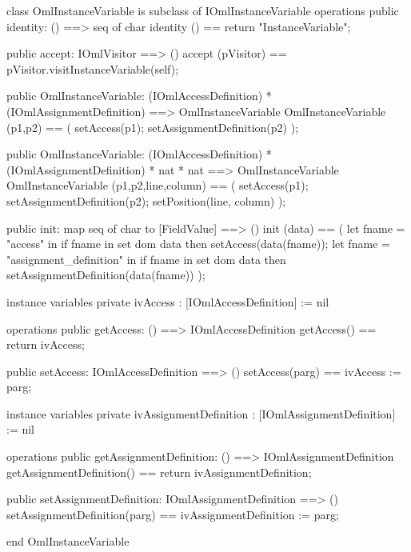 \begin{vdm_al}
class OmlInstanceVariable is subclass of IOmlInstanceVariable
operations
  public identity: () ==> seq of char
  identity () == return "InstanceVariable";

  public accept: IOmlVisitor ==> ()
  accept (pVisitor) == pVisitor.visitInstanceVariable(self);

  public OmlInstanceVariable:
    (IOmlAccessDefinition) *
    (IOmlAssignmentDefinition) ==> OmlInstanceVariable
  OmlInstanceVariable (p1,p2) == 
    ( setAccess(p1);
      setAssignmentDefinition(p2) );

  public OmlInstanceVariable:
    (IOmlAccessDefinition) *
    (IOmlAssignmentDefinition) *
    nat *
    nat ==> OmlInstanceVariable
  OmlInstanceVariable (p1,p2,line,column) == 
    ( setAccess(p1);
      setAssignmentDefinition(p2);
      setPosition(line, column) );

  public init: map seq of char to [FieldValue] ==> ()
  init (data) ==
    ( let fname = "access" in
        if fname in set dom data
        then setAccess(data(fname));
      let fname = "assignment_definition" in
        if fname in set dom data
        then setAssignmentDefinition(data(fname)) );

instance variables
  private ivAccess : [IOmlAccessDefinition] := nil

operations
  public getAccess: () ==> IOmlAccessDefinition
  getAccess() == return ivAccess;

  public setAccess: IOmlAccessDefinition ==> ()
  setAccess(parg) == ivAccess := parg;

instance variables
  private ivAssignmentDefinition : [IOmlAssignmentDefinition] := nil

operations
  public getAssignmentDefinition: () ==> IOmlAssignmentDefinition
  getAssignmentDefinition() == return ivAssignmentDefinition;

  public setAssignmentDefinition: IOmlAssignmentDefinition ==> ()
  setAssignmentDefinition(parg) == ivAssignmentDefinition := parg;

end OmlInstanceVariable
\end{vdm_al}

